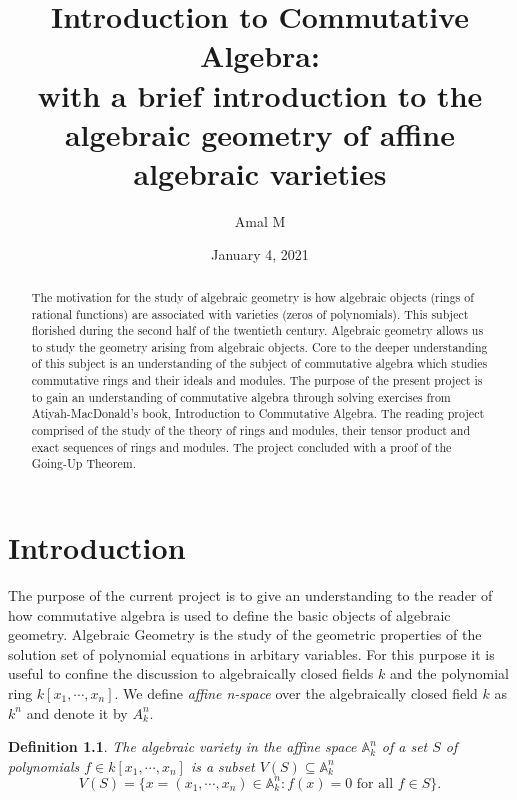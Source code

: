 \documentclass[]{report}
\newtheorem{defn}[theorem]{Definition}
\begin{document}
\title{%
    Introduction to Commutative Algebra: \\
    
    \large with a brief introduction to the \\
    algebraic geometry of affine \\
    algebraic varieties}
\author{Amal M}
\date{January 4, 2021}
\maketitle

\begin{abstract}

    The motivation for the study of algebraic geometry is how algebraic objects (rings of rational functions) are associated with varieties (zeros of polynomials). This subject florished during the second half of the twentieth century. Algebraic geometry allows us to study the geometry arising from algebraic objects. Core to the deeper understanding of this subject is an understanding of the subject of commutative algebra which studies commutative rings and their ideals and modules. The purpose of the present project is to gain an understanding of commutative algebra through solving exercises from Atiyah-MacDonald's book, Introduction to Commutative Algebra. The reading project comprised of the study of the theory of rings and modules, their tensor product and exact sequences of rings and modules. The project concluded with a proof of the Going-Up Theorem.

\end{abstract}

\tableofcontents
\newpage

\chapter{Introduction}

The purpose of the current project is to give an understanding 
to the reader of how commutative algebra is used to define the basic
objects of algebraic geometry. Algebraic Geometry is the study of
the geometric properties of the solution set of polynomial equations
in arbitary variables. For this purpose it is useful to confine the 
discussion to algebraically closed fields $k$ and the polynomial ring
$k[x_1,\cdots,x_n]$. We define \textit{affine n-space} over the algebraically closed field $k$ as $k^n$ and denote it by $A^n_k$.

\begin{defn} The algebraic variety \cite{vakil145} in the affine space $\mathbb{A}^n_k$ of a set $S$ of polynomials $f\in k[x_1,\cdots, x_n]$ is a subset $V(S)\subseteq \mathbb{A}^n_k$ 
    $$V(S) = \{x = (x_1,\cdots,x_n) \in \mathbb{A}^n_k : f(x) = 0 \text{ for all } f \in S\}.$$
\end{defn}
\end{document}
